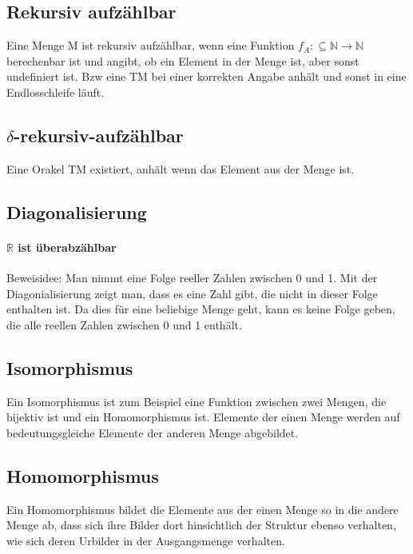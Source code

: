 \documentclass[ngerman]{scrartcl}
\begin{document}
\subsection{Rekursiv aufzählbar}
Eine Menge M ist rekursiv aufzählbar, wenn eine Funktion $ f_A : \subseteq \mathbb{N} \rightarrow \mathbb{N} $ berechenbar ist und angibt, ob ein Element in der Menge ist, aber sonst undefiniert ist. Bzw eine TM bei einer korrekten Angabe anhält und sonst in eine Endlosschleife läuft.

\subsection{$ \delta $-rekursiv-aufzählbar} Eine Orakel TM existiert, anhält wenn das Element aus der Menge ist.

\subsection{Diagonalisierung}
\paragraph{$ \mathbb{R} $ ist überabzählbar}

Beweisidee: Man nimmt eine Folge reeller Zahlen zwischen 0 und 1. Mit der Diagonialisierung zeigt man, dass es eine Zahl gibt, die nicht in dieser Folge enthalten ist. Da dies für eine beliebige Menge geht, kann es keine Folge geben, die alle reellen Zahlen zwischen 0 und 1 enthält.

\subsection{Isomorphismus}
Ein Isomorphismus ist zum Beispiel eine Funktion zwischen zwei Mengen, die bijektiv ist und ein Homomorphismus ist. Elemente der einen Menge werden auf bedeutungsgleiche Elemente der anderen Menge abgebildet.

\subsection{Homomorphismus}
Ein Homomorphismus bildet die Elemente aus der einen Menge so in die andere Menge ab, dass sich ihre Bilder dort hinsichtlich der Struktur ebenso verhalten, wie sich deren Urbilder in der Ausgangsmenge verhalten.
\end{document}

